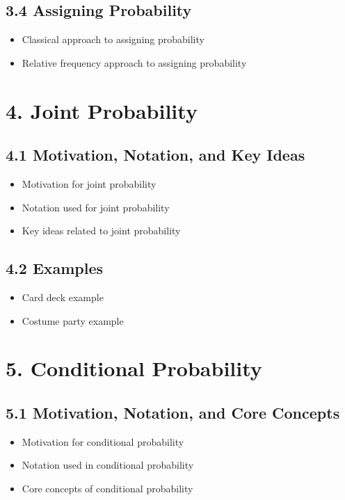 \documentclass[12pt]{article}
\begin{document}
\subsection*{3.4 Assigning Probability}
\begin{itemize}
\item Classical approach to assigning probability
\item Relative frequency approach to assigning probability
\end{itemize}

\section*{4. Joint Probability}

\subsection*{4.1 Motivation, Notation, and Key Ideas}
\begin{itemize}
\item Motivation for joint probability
\item Notation used for joint probability
\item Key ideas related to joint probability
\end{itemize}

\subsection*{4.2 Examples}
\begin{itemize}
\item Card deck example
\item Costume party example
\end{itemize}

\section*{5. Conditional Probability}

\subsection*{5.1 Motivation, Notation, and Core Concepts}
\begin{itemize}
\item Motivation for conditional probability
\item Notation used in conditional probability
\item Core concepts of conditional probability
\end{itemize}
\end{document}
